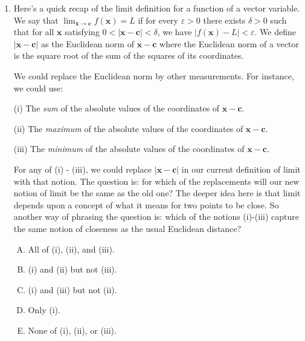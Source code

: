 \documentclass[10pt]{amsart}
\begin{document}
\begin{enumerate}
  {\em Answer}: Option (D)

  {\em Explanation}: Basically, any shape that is bounded both from
  inside and from outside by a circle will do.

  {\em Performance review}: $24$ out of $26$ got this. $1$ each chose
  (B) and (E).

  {\em Historical note (last time)}: $12$ out of $22$ people got this
  correct. $6$ chose (A), $4$ chose (E).

\item Here's a quick recap of the limit definition for a function of a
  vector variable. We say that $\displaystyle \lim_{\mathbf{x} \to \mathbf{c}}
  f(\mathbf{x}) = L$ if for every $\varepsilon > 0$ there exists
  $\delta > 0$ such that for all $\mathbf{x}$ satisfying $0 <
  |\mathbf{x} - \mathbf{c}| < \delta$, we have $|f(\mathbf{x}) - L| <
  \varepsilon$. We define $|\mathbf{x} - \mathbf{c}|$ as the Euclidean
  norm of $\mathbf{x} - \mathbf{c}$ where the Euclidean norm of a
  vector is the square root of the sum of the squares of its
  coordinates.

  We could replace the Euclidean norm by other measurements. For
  instance, we could use:

  (i) The {\em sum} of the absolute values of the coordinates of
  $\mathbf{x} - \mathbf{c}$.

  (ii) The {\em maximum} of the absolute values of the coordinates of
  $\mathbf{x} - \mathbf{c}$.

  (iii) The {\em minimum} of the absolute values of the coordinates of
  $\mathbf{x} - \mathbf{c}$.

  For any of (i) - (iii), we could replace $|\mathbf{x} - \mathbf{c}|$
  in our current definition of limit with that notion. The question
  is: for which of the replacements will our new notion of limit be
  the same as the old one? The deeper idea here is that limit depends
  upon a concept of what it means for two points to be close. So
  another way of phrasing the question is: which of the notions
  (i)-(iii) capture the same notion of closeness as the usual
  Euclidean distance?

  \begin{enumerate}[(A)]
  \item All of (i), (ii), and (iii).
  \item (i) and (ii) but not (iii).
  \item (i) and (iii) but not (ii).
  \item Only (i).
  \item None of (i), (ii), or (iii).
  \end{enumerate}


\end{enumerate}
\end{document}
